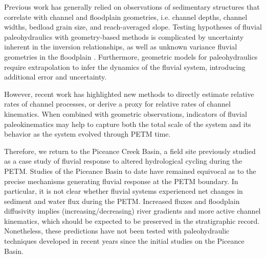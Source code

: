 \documentclass[draft]{compact_proposal}
\begin{document}
Previous work has generally relied on observations of sedimentary structures that correlate with channel and floodplain geometries, i.e. channel depths, channel widths, bedload grain size, and reach-averaged slope.
Testing hypotheses of fluvial paleohydraulics with geometry-based methods is complicated by uncertainty inherent in the inversion relationships, as well as unknown variance fluvial geometries in the floodplain .
Furthermore, geometric models for paleohydraulics require extrapolation to infer the dynamics of the fluvial system, introducing additional error and uncertainty.

However, recent work has highlighted new methods to directly estimate relative rates of channel processes, or derive a proxy for relative rates of channel kinematics.
When combined with geometric observations, indicators of fluvial paleokinematics may help to capture both the total scale of the system and its behavior as the system evolved through PETM time.



Therefore, we return to the Piceance Creek Basin, a field site previously studied as a case study of fluvial response to altered hydrological cycling during the PETM.
Studies of the Piceance Basin to date  have remained equivocal as to the precise mechanisms generating fluvial response at the PETM boundary.
In particular, it is not clear whether fluvial systems experienced net changes in sediment and water flux during the PETM.
Increased fluxes and floodplain diffusivity implies (increasing/decreasing) river gradients and more active channel kinematics, which should be expected to be preserved in the stratigraphic record.
Nonetheless, these predictions have not been tested with paleohydraulic techniques developed in recent years since the initial studies on the Piceance Basin.
\end{document}
